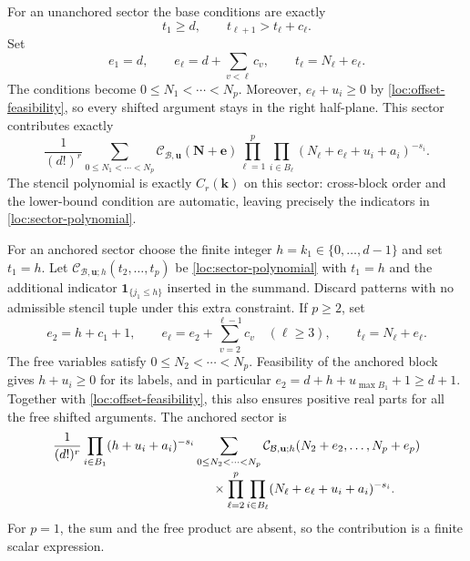 \documentclass[11pt,a4paper]{article}
\numberwithin{equation}{section}
\theoremstyle{definition}
\theoremstyle{remark}
\newcommand{\ind}{\mathbf 1}
\begin{document}
For an unanchored sector the base conditions are exactly
\[
 t_1\ge d,\qquad t_{\ell+1}>t_\ell+c_\ell.
\]
Set
\begin{equation}
 e_1=d,\qquad e_\ell=d+\sum_{v<\ell}c_v,
 \qquad t_\ell=N_\ell+e_\ell.
 \label{loc:free-bases}
\end{equation}
The conditions become $0\le N_1<\cdots<N_p$.  Moreover,
$e_\ell+u_i\ge0$ by \eqref{loc:offset-feasibility}, so every shifted
argument stays in the right half-plane.  This sector contributes exactly
\begin{equation}
 \frac1{(d!)^r}
 \sum_{0\le N_1<\cdots<N_p}
       \mathcal C_{\mathcal B,\mathbf u}(\mathbf N+\mathbf e)
       \prod_{\ell=1}^p\prod_{i\in B_\ell}
                    (N_\ell+e_\ell+u_i+a_i)^{-s_i}.
 \label{loc:free-sector}
\end{equation}
The stencil polynomial is exactly $C_r(\mathbf k)$ on this sector:
cross-block order and the lower-bound condition are automatic, leaving
precisely the indicators in \eqref{loc:sector-polynomial}.

For an anchored sector choose the finite integer
$h=k_1\in\{0,\ldots,d-1\}$ and set $t_1=h$.  Let
$\mathcal C_{\mathcal B,\mathbf u;h}(t_2,\ldots,t_p)$ be
\eqref{loc:sector-polynomial} with $t_1=h$ and the additional indicator
$\ind_{\{j_1\le h\}}$ inserted in the summand.  Discard patterns with
no admissible stencil tuple under this extra constraint.  If $p\ge2$,
set
\begin{equation}
 e_2=h+c_1+1,\qquad
 e_\ell=e_2+\sum_{v=2}^{\ell-1}c_v\quad(\ell\ge3),
 \qquad t_\ell=N_\ell+e_\ell.
 \label{loc:anchored-bases}
\end{equation}
The free variables satisfy $0\le N_2<\cdots<N_p$.  Feasibility of the
anchored block gives $h+u_i\ge0$ for its labels, and in particular
$e_2=d+h+u_{\max B_1}+1\ge d+1$.  Together with
\eqref{loc:offset-feasibility}, this also ensures positive real parts for
all the free shifted arguments.  The anchored sector is
\begin{align}
 &\frac1{(d!)^r}
   \prod_{i\in B_1}(h+u_i+a_i)^{-s_i}
   \sum_{0\le N_2<\cdots<N_p}
     \mathcal C_{\mathcal B,\mathbf u;h}
                      (N_2+e_2,\ldots,N_p+e_p)
 \notag\\[-2pt]
 &\hspace{44mm}\times
       \prod_{\ell=2}^p\prod_{i\in B_\ell}
                   (N_\ell+e_\ell+u_i+a_i)^{-s_i}.
 \label{loc:anchored-sector}
\end{align}
For $p=1$, the sum and the free product are absent, so the contribution
is a finite scalar expression.
\end{document}
